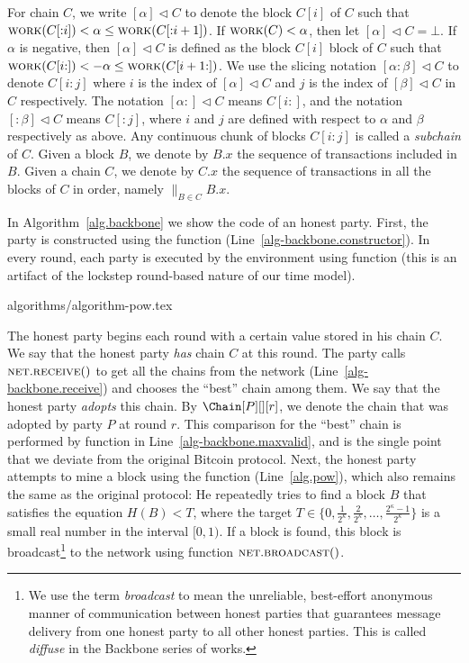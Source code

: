 \noindent
{}
For chain $C$, we write $[\alpha] \lhd C$
to denote the block $C[i]$ of $C$ such that
$\textsc{work}(C[{:}{i}]) < \alpha \leq \textsc{work}(C[{:}{i + 1}])$.
If $\textsc{work}(C) < \alpha$, then let $[\alpha] \lhd C = \bot$.
If $\alpha$ is negative, then $[\alpha] \lhd C$ is defined as
the block $C[i]$ block of $C$ such that
$\textsc{work}(C[{i}{:}]) < -\alpha \leq \textsc{work}(C[{i + 1}{:}])$.
We use the slicing notation $[{\alpha}{:}{\beta}] \lhd C$ to denote
$C[{i}{:}{j}]$ where $i$ is the index of $[\alpha] \lhd C$
and $j$ is the index of $[\beta] \lhd C$ in $C$ respectively.
The notation $[{\alpha}{:}] \lhd C$ means $C[{i}{:}]$,
and the notation $[{:}\beta] \lhd C$ means $C[{:}{j}]$,
where $i$ and $j$ are defined with respect to $\alpha$ and $\beta$
respectively as above.
Any continuous chunk of blocks $C[{i}{:}{j}]$ is called a \emph{subchain} of $C$.
Given a block $B$, we denote by $B.x$ the sequence of transactions
included in $B$.
Given a chain $C$, we denote by $C.x$
the sequence of transactions in all the blocks of $C$ in order, namely
${\big\lVert}_{B \in C} B.x$.

In Algorithm~\ref{alg.backbone} we show the code of an honest party.
First, the party is constructed using the \constructor function (Line~\ref{alg-backbone.constructor}).
In every round, each party is executed by the environment using function \execute
(this is an artifact of the lockstep round-based nature of
our time model).

{algorithms/algorithm-pow.tex}

The honest party begins each round with a certain value stored in his chain $C$.
We say that the honest party \emph{has} chain $C$ at this round. The party calls $\textsc{net}.\textsc{re}\-\textsc{ceive}()$ to get all
the chains from the network (Line~\ref{alg-backbone.receive}) and chooses the
``best'' chain among them. We say that the honest party
\emph{adopts} this chain. By $\Chain[P][][r]$, we denote the chain that was adopted
by party $P$ at round $r$.
This comparison for the ``best'' chain is performed by
function \maxvalid in Line~\ref{alg-backbone.maxvalid}, and
is the single point that we deviate from the original Bitcoin protocol.
Next, the honest party attempts to mine a block using the \pow function (Line~\ref{alg.pow}),
which also remains the same as the original protocol: He repeatedly tries to find a block $B$
that satisfies the \pow equation $H(B) < T$, where the target
$T \in \{0, \frac{1}{2^\kappa}, \frac{2}{2^\kappa}, \ldots, \frac{2^\kappa - 1}{2^\kappa}\}$ is a small real number in
the interval $[0, 1)$.
If a block is found, this block is broadcast\footnote{We use the term \emph{broadcast}
to mean the unreliable, best-effort anonymous manner of communication between honest parties that
guarantees message delivery from one honest party to all other honest parties.
This is called \emph{diffuse} in the Backbone series of works.}
to the network using function $\textsc{net}.\textsc{broadcast}()$.

